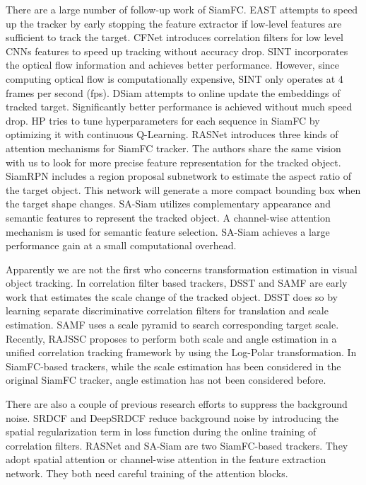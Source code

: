 \documentclass[runningheads]{llncs}
\begin{document}
There are a large number of follow-up work \cite{RFL,CFNET,EAST,SINT,DSiam,SiamRPN,SiamDCF,SASiam,HP,RASNet} of SiamFC. EAST \cite{EAST} attempts to speed up the tracker by early stopping the feature extractor if low-level features are sufficient to track the target. CFNet \cite{CFNET} introduces correlation filters for low level CNNs features to speed up tracking without accuracy drop. 
SINT \cite{SINT} incorporates the optical flow information and achieves better performance. However, since computing optical flow is computationally expensive, SINT only operates at 4 frames per second (fps). DSiam \cite{DSiam} attempts to online update the embeddings of tracked target. Significantly better performance is achieved without much speed drop. HP \cite{HP} tries to tune hyperparameters for each sequence in SiamFC \cite{SiamFC} by optimizing it with continuous Q-Learning. RASNet \cite{RASNet} introduces three kinds of attention mechanisms for SiamFC \cite{SiamFC} tracker. The authors share the same vision with us to look for more precise feature representation for the tracked object. 
SiamRPN \cite{SiamRPN} includes a region proposal subnetwork to estimate the aspect ratio of the target object. This network will generate a more compact bounding box when the target shape changes. SA-Siam \cite{SASiam} utilizes complementary appearance and semantic features to represent the tracked object. A channel-wise attention mechanism is used for semantic feature selection. SA-Siam achieves a large performance gain at a small computational overhead. 

Apparently we are not the first who concerns transformation estimation in visual object tracking. In correlation filter based trackers, DSST \cite{DSST} and SAMF \cite{SAMF} are early work that estimates the scale change of the tracked object. DSST \cite{DSST} does so by learning separate discriminative correlation filters for translation and scale estimation. SAMF \cite{SAMF} uses a scale pyramid to search corresponding target scale. Recently, RAJSSC \cite{RAJSSC} proposes to perform both scale and angle estimation in a unified correlation tracking framework by using the Log-Polar transformation. In SiamFC-based trackers, while the scale estimation has been considered in the original SiamFC tracker, angle estimation has not been considered before. 

There are also a couple of previous research efforts to suppress the background noise. SRDCF \cite{SRDCF} and DeepSRDCF \cite{DeepSRDCF} reduce background noise by introducing the spatial regularization term in loss function during the online training of correlation filters. RASNet \cite{RASNet} and SA-Siam \cite{SASiam} are two SiamFC-based trackers. They adopt spatial attention or channel-wise attention in the feature extraction network. They both need careful training of the attention blocks. 
\end{document}

